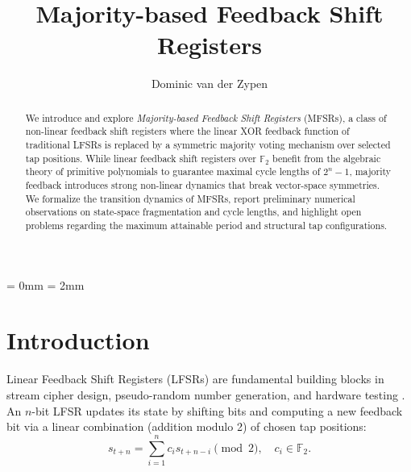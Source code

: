 \documentclass[11pt,reqno]{amsart}
\title{Majority-based Feedback Shift Registers}
\author{Dominic van der Zypen}
\theoremstyle{definition}
\newcommand{\F}{\mathbb{F}_2}
\begin{document}
\parindent = 0mm
\parskip = 2mm

\begin{abstract}
We introduce and explore \emph{Majority-based Feedback Shift Registers} (MFSRs), 
a class of non-linear feedback shift registers where the linear XOR 
feedback function of traditional LFSRs is replaced by a symmetric majority 
voting mechanism over selected tap positions. While linear feedback 
shift registers over $\F$ benefit from the algebraic theory of 
primitive polynomials to guarantee maximal cycle lengths of $2^n - 1$, 
majority feedback introduces strong non-linear dynamics that break 
vector-space symmetries. We formalize the transition dynamics of 
MFSRs, report preliminary numerical observations on state-space fragmentation 
and cycle lengths, and highlight open problems regarding the maximum 
attainable period and structural tap configurations.
\end{abstract}

\maketitle

\section{Introduction}

Linear Feedback Shift Registers (LFSRs) are fundamental building blocks in stream 
cipher design, pseudo-random number generation, and hardware 
testing \cite{Golomb1982, Rueppel1986, Menezes1996}. An $n$-bit LFSR 
updates its state by shifting bits and computing a new 
feedback bit via a linear combination (addition modulo 2) of chosen tap positions:
\[
s_{t+n} = \sum_{i=1}^{n} c_i s_{t+n-i} \pmod 2, \quad c_i \in \F.
\]
\end{document}
